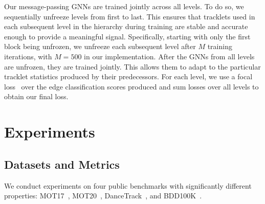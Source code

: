 \documentclass[10pt,twocolumn,letterpaper]{article}
\begin{document}
{{ Our message-passing GNNs are trained jointly across all levels. To do so, we sequentially unfreeze levels from first to last. This ensures that tracklets used in each subsequent level in the hierarchy during training are stable and accurate enough to provide a meaningful signal. 
Specifically, starting with only the first block being unfrozen, we unfreeze each subsequent level after $M$ training iterations, with $M=500$ in our implementation. After the GNNs from all levels are unfrozen, they are trained jointly. This allows them to adapt to the particular tracklet statistics produced by their predecessors. 
For each level, we use a focal loss~\cite{focal_loss} over the edge classification scores produced and sum losses over all levels to obtain our final loss.








 
\section{Experiments}
\label{sec:experiments}

\subsection{Datasets and Metrics}
We conduct experiments on four public benchmarks with significantly different properties: MOT17~\cite{motchaijcv}, MOT20~\cite{mot20}, DanceTrack~\cite{dancetrack}, and BDD100K~\cite{bdd}.
\begin{table*}[ht]
\center
\tabcolsep=0.11cm

\end{table*}}}
\end{document}
